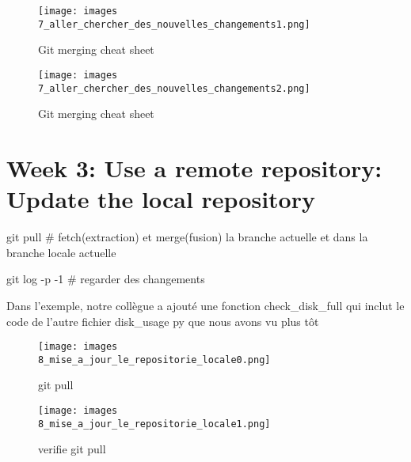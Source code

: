 \documentclass[11pt, onecolumn]{article}
\begin{document}
\begin{figure}[h]
\begin{center}
\texttt{[image: images\\7\_aller\_chercher\_des\_nouvelles\_changements1.png]}
\end{center}
\caption{Git merging cheat sheet}
\label{7_aller_chercher_des_nouvelles_changements1}
\end{figure}


\begin{figure}[h]
\begin{center}
\texttt{[image: images\\7\_aller\_chercher\_des\_nouvelles\_changements2.png]}
\end{center}
\caption{Git merging cheat sheet}
\label{7_aller_chercher_des_nouvelles_changements2}
\end{figure}


\section{Week 3: Use a remote repository: Update the local repository}

git pull    # fetch(extraction) et merge(fusion) la branche actuelle et dans la branche locale actuelle

git log -p -1    # regarder des changements 

Dans l'exemple, notre collègue a ajouté une fonction check_disk_full qui inclut le code de l'autre fichier disk_usage py que nous avons vu plus tôt

\begin{figure}[h]
\begin{center}
\texttt{[image: images\\8\_mise\_a\_jour\_le\_repositorie\_locale0.png]}
\end{center}
\caption{git pull}
\label{8_mise_a_jour_le_repositorie_locale0}
\end{figure}

\begin{figure}[h]
\begin{center}
\texttt{[image: images\\8\_mise\_a\_jour\_le\_repositorie\_locale1.png]}
\end{center}
\caption{verifie git pull}
\label{8_mise_a_jour_le_repositorie_locale1}
\end{figure}
\end{document}
